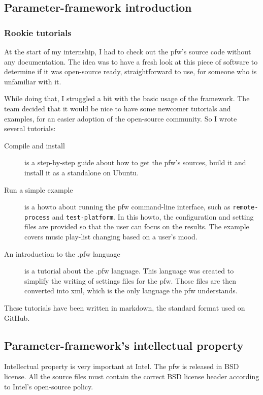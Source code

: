 \subsection{Parameter-framework introduction}
\subsubsection{Rookie tutorials}\label{sec:tutorials}

At the start of my internship, I had to check out the \gls{pfw}'s
source code without any documentation. The idea was to have a fresh look at
this piece of software to determine if it was open-source ready, straightforward
to use, for someone who is unfamiliar with it.

While doing that, I struggled a bit with the basic usage of the framework. The
team decided that it would be nice to have some newcomer tutorials and examples,
for an easier adoption of the open-source community. So I wrote several
tutorials:
\begin{description}
    \item[Compile and install]
        is a step-by-step guide about how to get the \gls{pfw}'s sources,
        build it and install it as a standalone on Ubuntu.
    \item[Run a simple example]
        is a howto about running the \gls{pfw} command-line interface,
        such as \lstinline{remote-process} and \lstinline {test-platform}.  In
        this howto, the configuration and setting files are provided so that
        the user can focus on the results. The example covers music play-list
        changing based on a user's mood.
    \item[An introduction to the .pfw language]\label{desc:pfw-language}
        is a tutorial about the .pfw language. This language was
        created to simplify the writing of settings files for the
        \gls{pfw}. Those files are then converted into \gls{xml}, which is
        the only language the \gls{pfw} understands.
\end{description}
These tutorials have been written in \gls{markdown}, the standard format used
on \gls{GitHub}.

\subsection{Parameter-framework's intellectual property}
Intellectual property is very important at Intel. The \gls{pfw} is released in
BSD license. All the source files must contain the correct BSD license header according
to Intel's open-source policy.

